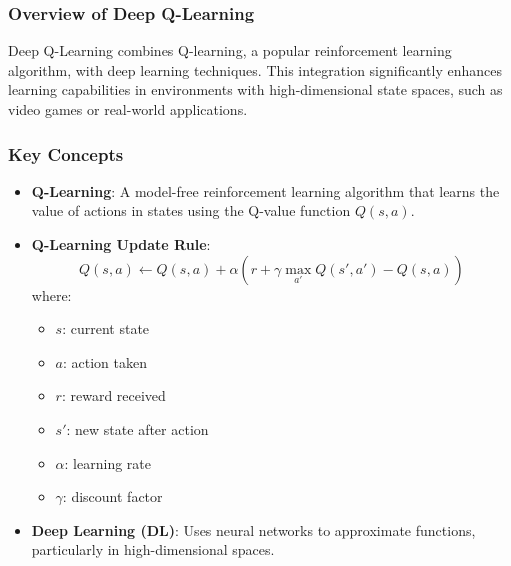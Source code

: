 \documentclass[aspectratio=169]{beamer}
\begin{document}
\begin{frame}[fragile]
    \frametitle{Overview of Deep Q-Learning}
    Deep Q-Learning combines Q-learning, a popular reinforcement learning algorithm, with deep learning techniques. This integration significantly enhances learning capabilities in environments with high-dimensional state spaces, such as video games or real-world applications.
\end{frame}

\begin{frame}[fragile]
    \frametitle{Key Concepts}
    \begin{itemize}
        \item \textbf{Q-Learning}: A model-free reinforcement learning algorithm that learns the value of actions in states using the Q-value function \( Q(s, a) \).
        \item \textbf{Q-Learning Update Rule}:
        \begin{equation}
            Q(s, a) \leftarrow Q(s, a) + \alpha \left( r + \gamma \max_{a'} Q(s', a') - Q(s, a) \right)
        \end{equation}
        where:
        \begin{itemize}
            \item \( s \): current state
            \item \( a \): action taken
            \item \( r \): reward received
            \item \( s' \): new state after action
            \item \( \alpha \): learning rate
            \item \( \gamma \): discount factor
        \end{itemize}
        \item \textbf{Deep Learning (DL)}: Uses neural networks to approximate functions, particularly in high-dimensional spaces.
    \end{itemize}
\end{frame}
\end{document}
